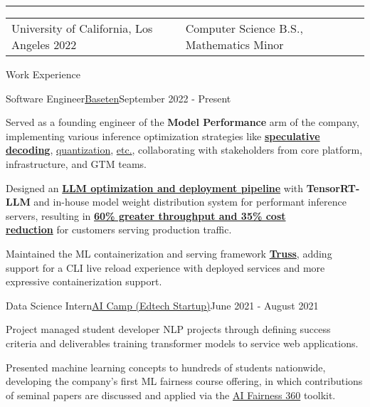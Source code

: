 \documentclass{resume}
\begin{document}
\hrule
\begin{tabularx}{\textwidth}{YY}
    \raggedright University of California, Los Angeles 2022 & \raggedleft Computer Science B.S., Mathematics Minor
\end{tabularx}

\begin{rSection}{Work Experience}
    \begin{rSubsection}{Software Engineer}{\href{https://www.baseten.co/}{Baseten}}{September 2022 - Present}
        \item Served as a founding engineer of the \textbf{Model Performance} arm of the company, implementing various inference optimization strategies like {\href{https://www.baseten.co/blog/how-we-built-production-ready-speculative-decoding-with-tensorrt-llm/}{\textbf{speculative decoding}}}, {\href{https://www.baseten.co/blog/33-faster-llm-inference-with-fp8-quantization/}{quantization}}, {\href{https://www.baseten.co/blog/driving-model-performance-optimization-2024-highlights/}{etc.}}, collaborating with stakeholders from core platform, infrastructure, and GTM teams. 
        \item Designed an {\href{https://www.baseten.co/blog/automatic-llm-optimization-with-tensorrt-llm-engine-builder/}{\textbf{LLM optimization and deployment pipeline}}} with \textbf{TensorRT-LLM} and in-house model weight distribution system for performant inference servers, resulting in {\href{https://www.baseten.co/customers/writer/}{\textbf{60\% greater throughput and 35\% cost \\ reduction}}} for customers serving production traffic.
        \item Maintained the ML containerization and serving framework {\href{https://github.com/basetenlabs/truss}{\textbf{Truss}}}, adding support for a CLI live reload experience with deployed services and more expressive containerization support.
    \end{rSubsection}
    \begin{rSubsection}{Data Science Intern}{\href{https://www.ai-camp.org/}{AI Camp (Edtech Startup)}}{June 2021 - August 2021}
        \item Project managed student developer NLP projects through defining success criteria and deliverables training transformer models to service web applications.
        \item Presented machine learning concepts to hundreds of students nationwide, developing the company's first ML fairness course offering, in which contributions of seminal papers are discussed and applied via the \href{https://github.com/Trusted-AI/AIF360}{AI Fairness 360} toolkit.

\end{rSubsection}
\end{rSection}
\end{document}
